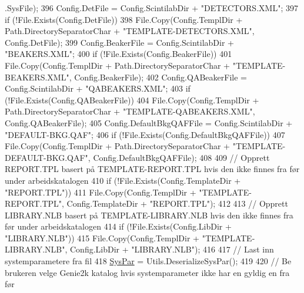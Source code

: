 \begin{DoxyCode}
      .SysFile); 
396                 Config.DetFile = Config.ScintilabDir + \textcolor{stringliteral}{"DETECTORS.XML"};
397                 \textcolor{keywordflow}{if} (!File.Exists(Config.DetFile))
398                     File.Copy(Config.TemplDir + Path.DirectorySeparatorChar + \textcolor{stringliteral}{"TEMPLATE-DETECTORS.XML"}, 
      Config.DetFile); 
399                 Config.BeakerFile = Config.ScintilabDir + \textcolor{stringliteral}{"BEAKERS.XML"};
400                 \textcolor{keywordflow}{if} (!File.Exists(Config.BeakerFile))
401                     File.Copy(Config.TemplDir + Path.DirectorySeparatorChar + \textcolor{stringliteral}{"TEMPLATE-BEAKERS.XML"}, 
      Config.BeakerFile); 
402                 Config.QABeakerFile = Config.ScintilabDir + \textcolor{stringliteral}{"QABEAKERS.XML"};
403                 \textcolor{keywordflow}{if} (!File.Exists(Config.QABeakerFile))
404                     File.Copy(Config.TemplDir + Path.DirectorySeparatorChar + \textcolor{stringliteral}{"TEMPLATE-QABEAKERS.XML"}, 
      Config.QABeakerFile); 
405                 Config.DefaultBkgQAFFile = Config.ScintilabDir + \textcolor{stringliteral}{"DEFAULT-BKG.QAF"};
406                 \textcolor{keywordflow}{if} (!File.Exists(Config.DefaultBkgQAFFile))
407                     File.Copy(Config.TemplDir + Path.DirectorySeparatorChar + \textcolor{stringliteral}{"TEMPLATE-DEFAULT-BKG.QAF"}, 
      Config.DefaultBkgQAFFile);
408 
409                 \textcolor{comment}{// Opprett REPORT.TPL basert på TEMPLATE-REPORT.TPL hvis den ikke finnes fra før under
       arbeidskatalogen}
410                 \textcolor{keywordflow}{if} (!File.Exists(Config.TemplateDir + \textcolor{stringliteral}{"REPORT.TPL"}))
411                     File.Copy(Config.TemplDir + \textcolor{stringliteral}{"TEMPLATE-REPORT.TPL"}, Config.TemplateDir + \textcolor{stringliteral}{"REPORT.TPL"});
412 
413                 \textcolor{comment}{// Opprett LIBRARY.NLB basert på TEMPLATE-LIBRARY.NLB hvis den ikke finnes fra før under
       arbeidskatalogen}
414                 \textcolor{keywordflow}{if} (!File.Exists(Config.LibDir + \textcolor{stringliteral}{"LIBRARY.NLB"}))
415                     File.Copy(Config.TemplDir + \textcolor{stringliteral}{"TEMPLATE-LIBRARY.NLB"}, Config.LibDir + \textcolor{stringliteral}{"LIBRARY.NLB"});
416 
417                 \textcolor{comment}{// Last inn systemparametere fra fil}
418                 \hyperlink{class_scintilab_1_1_form_main_ad41498eb151a72c77ad94c7285d0f506}{SysPar} = Utils.DeserializeSysPar();
419 
420                 \textcolor{comment}{// Be brukeren velge Genie2k katalog hvis systemparameter ikke har en gyldig en fra før}

\end{DoxyCode}
